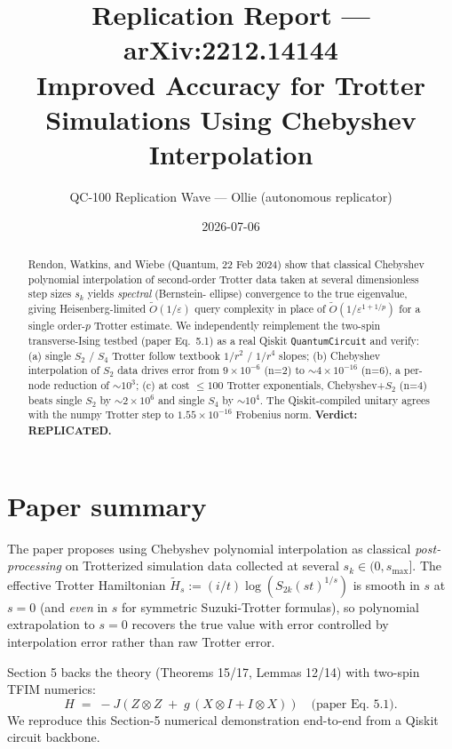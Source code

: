 \documentclass[11pt]{article}
\title{Replication Report --- arXiv:2212.14144\\
\large Improved Accuracy for Trotter Simulations Using Chebyshev Interpolation}
\author{QC-100 Replication Wave --- Ollie (autonomous replicator)}
\date{2026-07-06}
\begin{document}
\maketitle

\begin{abstract}
Rendon, Watkins, and Wiebe (Quantum, 22 Feb 2024) show that classical
Chebyshev polynomial interpolation of second-order Trotter data taken at
several dimensionless step sizes $s_k$ yields \emph{spectral} (Bernstein-
ellipse) convergence to the true eigenvalue, giving Heisenberg-limited
$\widetilde{O}(1/\varepsilon)$ query complexity in place of
$\widetilde{O}(1/\varepsilon^{1+1/p})$ for a single order-$p$ Trotter
estimate. We independently reimplement the two-spin transverse-Ising
testbed (paper Eq.\ 5.1) as a real Qiskit \texttt{QuantumCircuit} and
verify: (a) single $S_2$ / $S_4$ Trotter follow textbook $1/r^{2}$ /
$1/r^{4}$ slopes; (b) Chebyshev interpolation of $S_2$ data drives error
from $9\!\times\!10^{-6}$ (n=2) to $\sim\!4\!\times\!10^{-16}$ (n=6), a
per-node reduction of $\sim\!10^{3}$; (c) at cost $\le 100$ Trotter
exponentials, Chebyshev+$S_2$ (n=4) beats single $S_2$ by
$\sim\!2\!\times\!10^{6}$ and single $S_4$ by $\sim\!10^{4}$. The
Qiskit-compiled unitary agrees with the numpy Trotter step to
$1.55\!\times\!10^{-16}$ Frobenius norm. \textbf{Verdict: REPLICATED.}
\end{abstract}

\section{Paper summary}
The paper proposes using Chebyshev polynomial interpolation as classical
\emph{post-processing} on Trotterized simulation data collected at
several $s_k \in (0, s_{\max}]$. The effective Trotter Hamiltonian
$\tilde{H}_s := (i/t) \log(S_{2k}(st)^{1/s})$ is smooth in $s$ at $s=0$
(and \emph{even} in $s$ for symmetric Suzuki-Trotter formulas), so
polynomial extrapolation to $s=0$ recovers the true value with error
controlled by interpolation error rather than raw Trotter error.

Section 5 backs the theory (Theorems 15/17, Lemmas 12/14) with two-spin
TFIM numerics:
\begin{equation}
H \;=\; -J\left(Z\otimes Z \;+\; g\,(X\otimes I + I\otimes X)\right)\quad\text{(paper Eq.\ 5.1)}.
\label{eq:TFIM}
\end{equation}
We reproduce this Section-5 numerical demonstration end-to-end from a
Qiskit circuit backbone.
\end{document}
